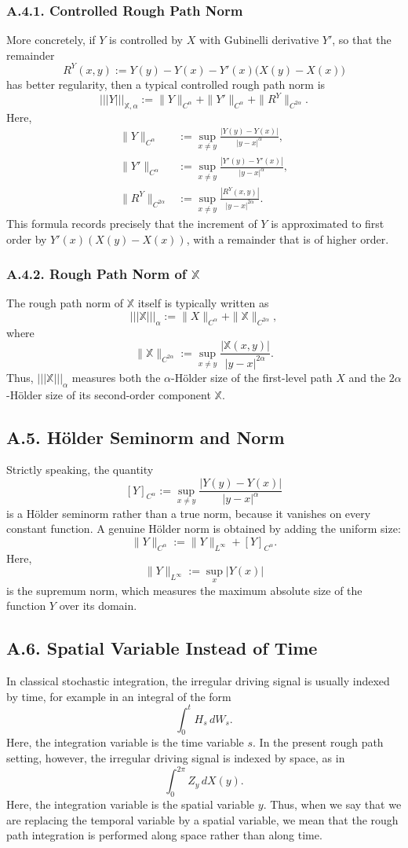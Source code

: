 \documentclass[11pt]{article}
\theoremstyle{definition}
\theoremstyle{remark}
\begin{document}
\subsubsection*{A.4.1. Controlled Rough Path Norm}
More concretely, if $Y$ is controlled by $X$ with Gubinelli derivative $Y'$, so that the remainder
\[
R^Y(x,y):=Y(y)-Y(x)-Y'(x)\bigl(X(y)-X(x)\bigr)
\]
has better regularity, then a typical controlled rough path norm is
\[
|||Y|||_{\mathbb X,\alpha}
:=
\|Y\|_{C^\alpha}
+
\|Y'\|_{C^\alpha}
+
\|R^Y\|_{C^{2\alpha}}.
\]
Here,
\[
\begin{aligned}
\|Y\|_{C^\alpha}
&:=
\sup_{x\neq y}\frac{|Y(y)-Y(x)|}{|y-x|^\alpha},\\
\|Y'\|_{C^\alpha}
&:=
\sup_{x\neq y}\frac{|Y'(y)-Y'(x)|}{|y-x|^\alpha},\\
\|R^Y\|_{C^{2\alpha}}
&:=
\sup_{x\neq y}\frac{|R^Y(x,y)|}{|y-x|^{2\alpha}}.
\end{aligned}
\]
This formula records precisely that the increment of $Y$ is approximated to first order by $Y'(x)(X(y)-X(x))$, with a remainder that is of higher order.

\subsubsection*{A.4.2. Rough Path Norm of $\mathbb X$}
The rough path norm of $\mathbb X$ itself is typically written as
\[
|||\mathbb X|||_{\alpha}
:=
\|X\|_{C^\alpha}
+
\|\mathbb X\|_{C^{2\alpha}},
\]
where
\[
\|\mathbb X\|_{C^{2\alpha}}
:=
\sup_{x\neq y}\frac{|\mathbb X(x,y)|}{|y-x|^{2\alpha}}.
\]
Thus, $|||\mathbb X|||_{\alpha}$ measures both the $\alpha$-H\"older size of the first-level path $X$ and the $2\alpha$-H\"older size of its second-order component $\mathbb X$.

\subsection*{A.5. H\"older Seminorm and Norm}
Strictly speaking, the quantity
\[
[Y]_{C^\alpha}
:=
\sup_{x\neq y}\frac{|Y(y)-Y(x)|}{|y-x|^\alpha}
\]
is a H\"older seminorm rather than a true norm, because it vanishes on every constant function. A genuine H\"older norm is obtained by adding the uniform size:
\[
\|Y\|_{C^\alpha}
:=
\|Y\|_{L^\infty}
+
[Y]_{C^\alpha}.
\]
Here,
\[
\|Y\|_{L^\infty}
:=
\sup_x |Y(x)|
\]
is the supremum norm, which measures the maximum absolute size of the function $Y$ over its domain.

\subsection*{A.6. Spatial Variable Instead of Time}
In classical stochastic integration, the irregular driving signal is usually indexed by time, for example in an integral of the form
\[
\int_0^t H_s\,dW_s.
\]
Here, the integration variable is the time variable $s$. In the present rough path setting, however, the irregular driving signal is indexed by space, as in
\[
\int_0^{2\pi} Z_y\,dX(y).
\]
Here, the integration variable is the spatial variable $y$. Thus, when we say that we are replacing the temporal variable by a spatial variable, we mean that the rough path integration is performed along space rather than along time.
\end{document}
